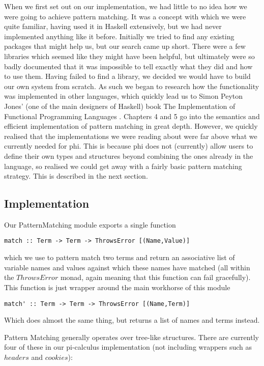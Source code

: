 When we first set out on our implementation, we had little to no idea how we were going to achieve pattern matching. It was a concept with which we were quite familiar, having used it in Haskell extensively, but we had never implemented anything like it before.
Initially we tried to find any existing packages that might help us, but our search came up short. There were a few libraries which seemed like they might have been helpful, but ultimately were so badly documented that it was impossible to tell exactly what they did and how to use them. 
Having failed to find a library, we decided we would have to build our own system from scratch. As such we began to research how the functionality was implemented in other languages, which quickly lead us to Simon Peyton Jones' (one of the main designers of Haskell) book The Implementation of Functional Programming Languages \cite{spj87}. Chapters 4 and 5 go into the semantics and efficient implementation of pattern matching in great depth. However, we quickly realised that the
implementations we were reading about were far above what we currently needed for phi. This is because phi
does not (currently) allow users to define their own types and structures beyond combining the ones already in the language, so realised we could get away with a fairly basic pattern matching strategy. This is described in the next section.

\subsection{Implementation}

Our PatternMatching module exports a single function
\begin{verbatim}
match :: Term -> Term -> ThrowsError [(Name,Value)]
\end{verbatim}
which we use to pattern match two terms and return an associative list of variable names and values against which these names have matched (all within the $ThrowsError$ monad, again meaning that this function can fail gracefully). This function is just wrapper around the main workhorse of this module
\begin{verbatim}
match' :: Term -> Term -> ThrowsError [(Name,Term)]
\end{verbatim}
Which does almost the same thing, but returns a list of names and terms instead.

Pattern Matching generally operates over tree-like structures. There are currently four of these in our pi-calculus implementation (not including wrappers such as $headers$ and $cookies$): 

